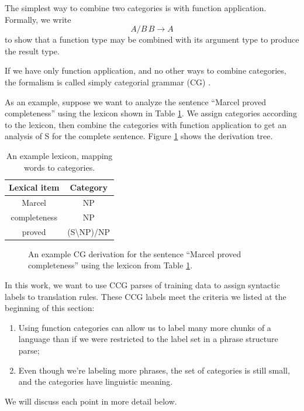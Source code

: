 \documentclass{article}
\begin{document}
The simplest way to combine two categories is with function application. Formally, we write
\begin{equation}
A/B \, B \to A \label{eqn:forward-app}
\end{equation}
to show that a function type may be combined with its argument type to produce the result type.

If we have only function application, and no other ways to combine categories, the formalism is called simply categorial grammar (CG) \cite{cg,bar-hillel-cg}.

As an example, suppose we want to analyze the sentence ``Marcel proved completeness'' using the lexicon shown in Table \ref{table:lexicon}. We assign categories according to the lexicon, then combine the categories with function application to get an analysis of S for the complete sentence. Figure \ref{fig:ccg-derivation} shows the derivation tree.

\begin{table}
\centering
\begin{tabular}{|c|c|}
\hline
Lexical item & Category \\
\hline
Marcel & NP \\
completeness & NP \\
proved & (S\textbackslash NP)/NP \\
\hline
\end{tabular}
\caption{An example lexicon, mapping words to categories.\label{table:lexicon}}
\end{table}

\begin{figure}
\centering
{}
\caption{An example CG derivation for the sentence ``Marcel proved completeness'' using the lexicon from Table \ref{table:lexicon}.\label{fig:ccg-derivation}}
\end{figure}

In this work, we want to use CCG parses of training data to assign syntactic labels to translation rules. These CCG labels meet the criteria we listed at the beginning of this section:
\begin{enumerate}
\item Using function categories can allow us to label many more chunks of a language than if we were restricted to the label set in a phrase structure parse;
\item Even though we're labeling more phrases, the set of categories is still small, and the categories have linguistic meaning.
\end{enumerate}
We will discuss each point in more detail below.
\end{document}
